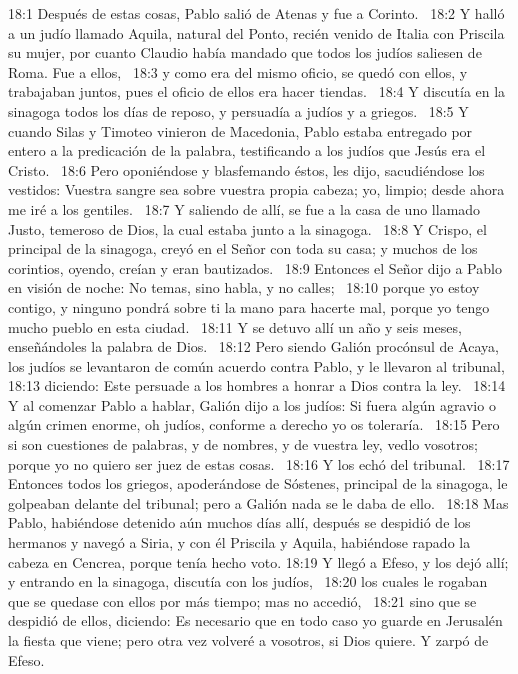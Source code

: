 18:1 Después de estas cosas, Pablo salió de Atenas y fue a Corinto.  
18:2 Y halló a un judío llamado Aquila, natural del Ponto, recién venido de Italia con Priscila su mujer, por cuanto Claudio había mandado que todos los judíos saliesen de Roma. Fue a ellos,  
18:3 y como era del mismo oficio, se quedó con ellos, y trabajaban juntos, pues el oficio de ellos era hacer tiendas.  
18:4 Y discutía en la sinagoga todos los días de reposo, y persuadía a judíos y a griegos.  
18:5 Y cuando Silas y Timoteo vinieron de Macedonia, Pablo estaba entregado por entero a la predicación de la palabra, testificando a los judíos que Jesús era el Cristo.  
18:6 Pero oponiéndose y blasfemando éstos, les dijo, sacudiéndose los vestidos: Vuestra sangre sea sobre vuestra propia cabeza; yo, limpio; desde ahora me iré a los gentiles.  
18:7 Y saliendo de allí, se fue a la casa de uno llamado Justo, temeroso de Dios, la cual estaba junto a la sinagoga.  
18:8 Y Crispo, el principal de la sinagoga, creyó en el Señor con toda su casa; y muchos de los corintios, oyendo, creían y eran bautizados.  
18:9 Entonces el Señor dijo a Pablo en visión de noche: No temas, sino habla, y no calles;  
18:10 porque yo estoy contigo, y ninguno pondrá sobre ti la mano para hacerte mal, porque yo tengo mucho pueblo en esta ciudad.  
18:11 Y se detuvo allí un año y seis meses, enseñándoles la palabra de Dios.  
18:12 Pero siendo Galión procónsul de Acaya, los judíos se levantaron de común acuerdo contra Pablo, y le llevaron al tribunal,  
18:13 diciendo: Este persuade a los hombres a honrar a Dios contra la ley.  
18:14 Y al comenzar Pablo a hablar, Galión dijo a los judíos: Si fuera algún agravio o algún crimen enorme, oh judíos, conforme a derecho yo os toleraría.  
18:15 Pero si son cuestiones de palabras, y de nombres, y de vuestra ley, vedlo vosotros; porque yo no quiero ser juez de estas cosas.  
18:16 Y los echó del tribunal.  
18:17 Entonces todos los griegos, apoderándose de Sóstenes, principal de la sinagoga, le golpeaban delante del tribunal; pero a Galión nada se le daba de ello.  
18:18 Mas Pablo, habiéndose detenido aún muchos días allí, después se despidió de los hermanos y navegó a Siria, y con él Priscila y Aquila, habiéndose rapado la cabeza en Cencrea, porque tenía hecho voto. 
18:19 Y llegó a Efeso, y los dejó allí; y entrando en la sinagoga, discutía con los judíos,  
18:20 los cuales le rogaban que se quedase con ellos por más tiempo; mas no accedió,  
18:21 sino que se despidió de ellos, diciendo: Es necesario que en todo caso yo guarde en Jerusalén la fiesta que viene; pero otra vez volveré a vosotros, si Dios quiere. Y zarpó de Efeso.  
